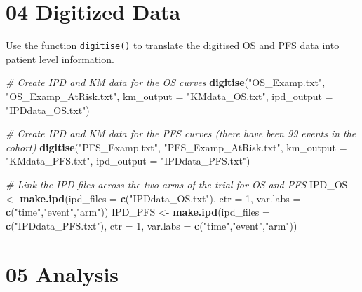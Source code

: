 \documentclass[
]{article}
\newenvironment{Shaded}{\begin{snugshade}}{\end{snugshade}}
\newcommand{\CommentTok}[1]{\textcolor[rgb]{0.56,0.35,0.01}{\textit{#1}}}
\newcommand{\DataTypeTok}[1]{\textcolor[rgb]{0.13,0.29,0.53}{#1}}
\newcommand{\DecValTok}[1]{\textcolor[rgb]{0.00,0.00,0.81}{#1}}
\newcommand{\KeywordTok}[1]{\textcolor[rgb]{0.13,0.29,0.53}{\textbf{#1}}}
\newcommand{\NormalTok}[1]{#1}
\newcommand{\StringTok}[1]{\textcolor[rgb]{0.31,0.60,0.02}{#1}}
\begin{document}
\hypertarget{digitized-data}{%
\section{04 Digitized Data}\label{digitized-data}}

Use the function \texttt{digitise()} to translate the digitised OS and
PFS data into patient level information.

\begin{Shaded}
\begin{Highlighting}[]
\CommentTok{# Create IPD and KM data for the OS curves}
\KeywordTok{digitise}\NormalTok{(}\StringTok{"OS_Examp.txt"}\NormalTok{, }
         \StringTok{"OS_Examp_AtRisk.txt"}\NormalTok{, }
         \DataTypeTok{km_output  =} \StringTok{"KMdata_OS.txt"}\NormalTok{, }
         \DataTypeTok{ipd_output =} \StringTok{"IPDdata_OS.txt"}\NormalTok{)}

\CommentTok{# Create IPD and KM data for the PFS curves (there have been 99 events in the cohort)}
\KeywordTok{digitise}\NormalTok{(}\StringTok{"PFS_Examp.txt"}\NormalTok{, }
         \StringTok{"PFS_Examp_AtRisk.txt"}\NormalTok{, }
         \DataTypeTok{km_output  =} \StringTok{"KMdata_PFS.txt"}\NormalTok{, }
         \DataTypeTok{ipd_output =} \StringTok{"IPDdata_PFS.txt"}\NormalTok{)}

\CommentTok{# Link the IPD files across the two arms of the trial for OS and PFS}
\NormalTok{IPD_OS  <-}\StringTok{ }\KeywordTok{make.ipd}\NormalTok{(}\DataTypeTok{ipd_files =} \KeywordTok{c}\NormalTok{(}\StringTok{"IPDdata_OS.txt"}\NormalTok{), }\DataTypeTok{ctr =} \DecValTok{1}\NormalTok{, }
                    \DataTypeTok{var.labs  =} \KeywordTok{c}\NormalTok{(}\StringTok{"time"}\NormalTok{,}\StringTok{"event"}\NormalTok{,}\StringTok{"arm"}\NormalTok{))}
\NormalTok{IPD_PFS <-}\StringTok{ }\KeywordTok{make.ipd}\NormalTok{(}\DataTypeTok{ipd_files =} \KeywordTok{c}\NormalTok{(}\StringTok{"IPDdata_PFS.txt"}\NormalTok{), }\DataTypeTok{ctr =} \DecValTok{1}\NormalTok{,}
                    \DataTypeTok{var.labs  =} \KeywordTok{c}\NormalTok{(}\StringTok{"time"}\NormalTok{,}\StringTok{"event"}\NormalTok{,}\StringTok{"arm"}\NormalTok{))}
\end{Highlighting}
\end{Shaded}

\hypertarget{analysis}{%
\section{05 Analysis}\label{analysis}}
\end{document}
